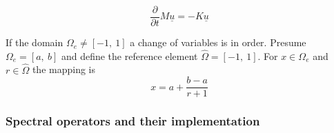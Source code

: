 \documentclass[10pt]{article}
\begin{document}
\begin{equation}
\frac{\partial}{\partial t} M \underline{u}=- K \underline{u} \label{eq:discrete}
\end{equation}

If the domain $\Omega_e \neq [-1, \ 1]$ a change of variables is in order.
Presume  $\Omega_e = [a, \ b]$ and define the reference element $\hat{\Omega} = [-1, \ 1]$.
For $x\in \Omega_e$ and $r \in \hat{\Omega}$ the mapping is
$$x= a+ \frac{b-a}{r+1}$$

\subsubsection{Spectral operators and their implementation}



\end{document}
